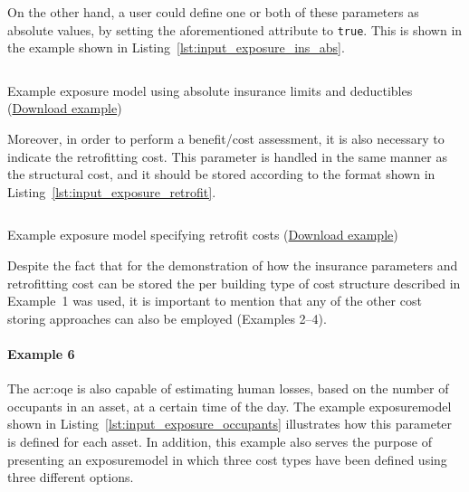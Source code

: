 On the other hand, a user could define one or both of these parameters as
absolute values, by setting the aforementioned attribute to \Verb+true+. This
is shown in the example shown in Listing~\ref{lst:input_exposure_ins_abs}.

\begin{listing}[htbp]
  \inputminted[firstline=1,firstnumber=1,fontsize=\footnotesize,frame=single,linenos,bgcolor=lightgray]{xml}{oqum/risk/verbatim/input_exposure_ins_abs.xml}
  \caption{Example exposure model using absolute insurance limits and deductibles (\href{https://raw.githubusercontent.com/gem/oq-engine/master/doc/manual/oqum/risk/verbatim/input_exposure_ins_abs.xml}{Download example})}
  \label{lst:input_exposure_ins_abs}
\end{listing}

Moreover, in order to perform a benefit/cost assessment, it is also necessary
to indicate the retrofitting cost. This parameter is handled in the same
manner as the structural cost, and it should be stored according to the format
shown in Listing~\ref{lst:input_exposure_retrofit}.

\begin{listing}[htbp]
  \inputminted[firstline=1,firstnumber=1,fontsize=\footnotesize,frame=single,linenos,bgcolor=lightgray]{xml}{oqum/risk/verbatim/input_exposure_retrofit.xml}
  \caption{Example exposure model specifying retrofit costs (\href{https://raw.githubusercontent.com/gem/oq-engine/master/doc/manual/oqum/risk/verbatim/input_exposure_retrofit.xml}{Download example})}
  \label{lst:input_exposure_retrofit}
\end{listing}

Despite the fact that for the demonstration of how the insurance parameters
and retrofitting cost can be stored the per building type of cost structure
described in Example~1 was used, it is important to mention that any of the
other cost storing approaches can also be employed (Examples 2--4).


\paragraph{Example 6}

The \glsdesc{acr:oqe} is also capable of estimating human losses, based on the
number of occupants in an \gls{asset}, at a certain time of the day. The example
\gls{exposuremodel} shown in Listing~\ref{lst:input_exposure_occupants} illustrates
how this parameter is defined for each \gls{asset}. In addition, this example also
serves the purpose of presenting an \gls{exposuremodel} in which three cost
types have been defined using three different options.

